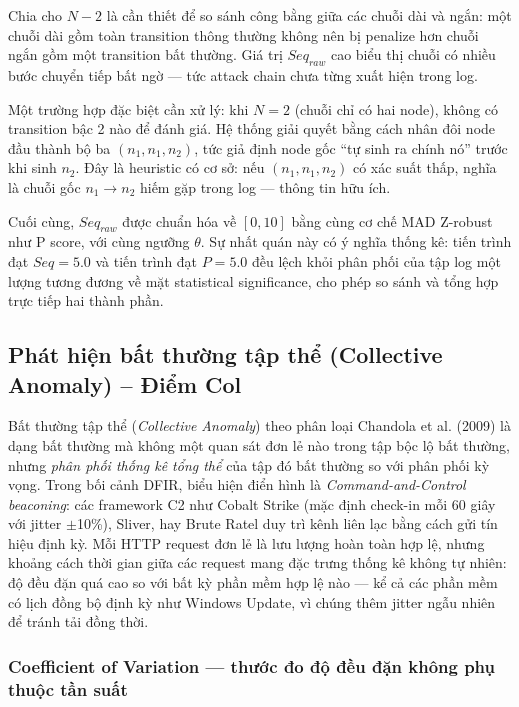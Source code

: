 \documentclass[../main.tex]{subfiles}
\begin{document}
Chia cho $N - 2$ là cần thiết để so sánh công bằng giữa các chuỗi dài và ngắn: một chuỗi dài gồm toàn transition thông thường không nên bị penalize hơn chuỗi ngắn gồm một transition bất thường. Giá trị $Seq_{raw}$ cao biểu thị chuỗi có nhiều bước chuyển tiếp bất ngờ — tức attack chain chưa từng xuất hiện trong log.

Một trường hợp đặc biệt cần xử lý: khi $N = 2$ (chuỗi chỉ có hai node), không có transition bậc 2 nào để đánh giá. Hệ thống giải quyết bằng cách nhân đôi node đầu thành bộ ba $(n_1, n_1, n_2)$, tức giả định node gốc ``tự sinh ra chính nó'' trước khi sinh $n_2$. Đây là heuristic có cơ sở: nếu $(n_1, n_1, n_2)$ có xác suất thấp, nghĩa là chuỗi gốc $n_1 \to n_2$ hiếm gặp trong log — thông tin hữu ích.

Cuối cùng, $Seq_{raw}$ được chuẩn hóa về $[0, 10]$ bằng cùng cơ chế MAD Z-robust như P score, với cùng ngưỡng $\theta$. Sự nhất quán này có ý nghĩa thống kê: tiến trình đạt $Seq = 5.0$ và tiến trình đạt $P = 5.0$ đều lệch khỏi phân phối của tập log một lượng tương đương về mặt statistical significance, cho phép so sánh và tổng hợp trực tiếp hai thành phần.

\subsection{Phát hiện bất thường tập thể (Collective Anomaly) – Điểm Col}
\label{subsection:2.4.5}

Bất thường tập thể (\textit{Collective Anomaly}) theo phân loại Chandola et al. (2009) là dạng bất thường mà không một quan sát đơn lẻ nào trong tập bộc lộ bất thường, nhưng \textit{phân phối thống kê tổng thể} của tập đó bất thường so với phân phối kỳ vọng. Trong bối cảnh DFIR, biểu hiện điển hình là \textit{Command-and-Control beaconing}: các framework C2 như Cobalt Strike (mặc định check-in mỗi 60 giây với jitter $\pm$10\%), Sliver, hay Brute Ratel duy trì kênh liên lạc bằng cách gửi tín hiệu định kỳ. Mỗi HTTP request đơn lẻ là lưu lượng hoàn toàn hợp lệ, nhưng khoảng cách thời gian giữa các request mang đặc trưng thống kê không tự nhiên: độ đều đặn quá cao so với bất kỳ phần mềm hợp lệ nào — kể cả các phần mềm có lịch đồng bộ định kỳ như Windows Update, vì chúng thêm jitter ngẫu nhiên để tránh tải đồng thời.

\subsubsection{Coefficient of Variation — thước đo độ đều đặn không phụ thuộc tần suất}
\label{subsubsection:2.4.5.1}
\end{document}

